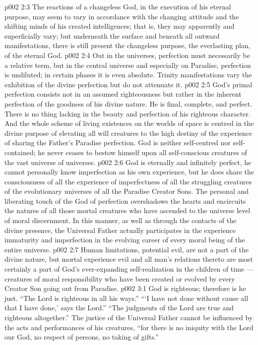 \vs p002 2:3 \pc The reactions of a changeless God, in the execution of his eternal purpose, may seem to vary in accordance with the changing attitude and the shifting minds of his created intelligences; that is, they may apparently and superficially vary; but underneath the surface and beneath all outward manifestations, there is still present the changeless purpose, the everlasting plan, of the eternal God.
\vs p002 2:4 Out in the universes, perfection must necessarily be a relative term, but in the central universe and especially on Paradise, perfection is undiluted; in certain phases it is even absolute. Trinity manifestations vary the exhibition of the divine perfection but do not attenuate it.
\vs p002 2:5 \pc God’s primal perfection consists not in an assumed righteousness but rather in the inherent perfection of the goodness of his divine nature. He is final, complete, and perfect. There is no thing lacking in the beauty and perfection of his righteous character. And the whole scheme of living existences on the worlds of space is centred in the divine purpose of elevating all will creatures to the high destiny of the experience of sharing the Father’s Paradise perfection. God is neither self\hyp{}centred nor self\hyp{}contained; he never ceases to bestow himself upon all self\hyp{}conscious creatures of the vast universe of universes.
\vs p002 2:6 God is eternally and infinitely perfect, he cannot personally know imperfection as his own experience, but he does share the consciousness of all the experience of imperfectness of all the struggling creatures of the evolutionary universes of all the Paradise Creator Sons. The personal and liberating touch of the God of perfection overshadows the hearts and encircuits the natures of all those mortal creatures who have ascended to the universe level of moral discernment. In this manner, as well as through the contacts of the divine presence, the Universal Father actually participates in the experience  immaturity and imperfection in the evolving career of every moral being of the entire universe.
\vs p002 2:7 Human limitations, potential evil, are not a part of the divine nature, but mortal experience  evil and all man’s relations thereto are most certainly a part of God’s ever\hyp{}expanding self\hyp{}realization in the children of time --- creatures of moral responsibility who have been created or evolved by every Creator Son going out from Paradise.
\vs p002 3:1 God is righteous; therefore is he just. “The Lord is righteous in all his ways.” “‘I have not done without cause all that I have done,’ says the Lord.” “The judgments of the Lord are true and righteous altogether.” The justice of the Universal Father cannot be influenced by the acts and performances of his creatures, “for there is no iniquity with the Lord our God, no respect of persons, no taking of gifts.”
